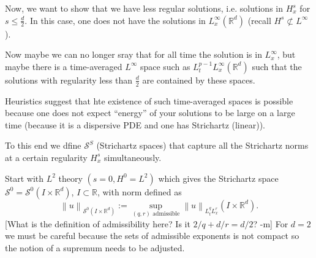 \documentclass{article}
\def\purple{\color{Purple}}
\newcommand{\pnote}[1]{{\purple [#1]}} %
\def\R{\mathbb{R}} %
\newcommand\norm[1]{\left\lVert#1\right\rVert}
\begin{document}
Now, we want to show that we have less regular solutions, i.e. solutions in
$H_{x}^{s}$ for $s \leq \frac{d}{2}$. In this case, one does not have the
solutions in $L_{x}^{\infty}(\R^d)$ (recall $H^{s}\not\subset L^{\infty}$).

Now maybe we can no longer sray that for all time the solution is in
$L_{x}^{\infty}$, but maybe there is a time-averaged $L^{\infty}$ space such as
$L_{t}^{p-1}L_{x}^{\infty}(\R^d)$ such that the solutions with regularity less
than $\frac{d}{2}$ are contained by these spaces.

Heuristics suggest that hte existence of such time-averaged spaces is possible
because one does not expect ``energy'' of your solutions to be large on a large
time (because it is a dispersive PDE and one has Strichartz (linear)).

To this end we dfine $\mathcal{S}^{S}$ (Strichartz spaces) that capture all the
Strichartz norms at a certain regularity $H_{x}^{s}$ simultaneously.

Start with $L^{2}$ theory $(s=0,H^{0}=L^{2})$ which gives the Strichartz space
$\mathcal{S}^{0}=\mathcal{S}^{0}(I\times \R^d)$, $I\subset \R$, with norm defined as
\begin{equation*}
  \norm{u}_{\mathcal{S}^{0}(I\times \R^d)} := \sup_{(q,r) \text{ admissible}} \norm{u}_{L_{t}^{q}L_{x}^{r}}(I\times \R^d).
\end{equation*}
\pnote{What is the definition of admissibility here? Is it $2/q+d/r = d/2$? -m}
For $d=2$ we must be careful because the sets of admissible exponents is not
compact so the notion of a supremum needs to be adjusted.
\end{document}
